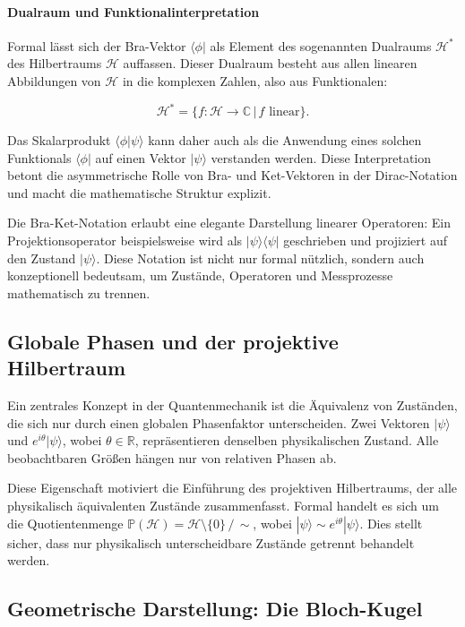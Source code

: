 \paragraph{Dualraum und Funktionalinterpretation}

Formal lässt sich der Bra-Vektor $\langle \phi|$ als Element des sogenannten Dualraums $\mathcal{H}^*$ des Hilbertraums $\mathcal{H}$ auffassen. Dieser Dualraum besteht aus allen linearen Abbildungen von $\mathcal{H}$ in die komplexen Zahlen, also aus Funktionalen:

\[
\mathcal{H}^* = \{ f : \mathcal{H} \to \mathbb{C} \,|\, f \text{ linear} \}.
\]

Das Skalarprodukt $\langle \phi | \psi \rangle$ kann daher auch als die Anwendung eines solchen Funktionals $\langle \phi|$ auf einen Vektor $|\psi\rangle$ verstanden werden. Diese Interpretation betont die asymmetrische Rolle von Bra- und Ket-Vektoren in der Dirac-Notation und macht die mathematische Struktur explizit.

Die Bra-Ket-Notation erlaubt eine elegante Darstellung linearer Operatoren: Ein Projektionsoperator beispielsweise wird als $|\psi\rangle\langle\psi|$ geschrieben und projiziert auf den Zustand $|\psi\rangle$. Diese Notation ist nicht nur formal nützlich, sondern auch konzeptionell bedeutsam, um Zustände, Operatoren und Messprozesse mathematisch zu trennen.

\subsection{Globale Phasen und der projektive Hilbertraum}

Ein zentrales Konzept in der Quantenmechanik ist die Äquivalenz von Zuständen, die sich nur durch einen globalen Phasenfaktor unterscheiden. Zwei Vektoren $|\psi\rangle$ und $e^{i\theta} |\psi\rangle$, wobei $\theta \in \mathbb{R}$, repräsentieren denselben physikalischen Zustand. Alle beobachtbaren Größen hängen nur von relativen Phasen ab.

Diese Eigenschaft motiviert die Einführung des projektiven Hilbertraums, der alle physikalisch äquivalenten Zustände zusammenfasst. Formal handelt es sich um die Quotientenmenge $\mathbb{P}(\mathcal{H}) = \mathcal{H} \setminus \{0\} \,/\, \sim$, wobei $|\psi\rangle \sim e^{i\theta}|\psi\rangle$. Dies stellt sicher, dass nur physikalisch unterscheidbare Zustände getrennt behandelt werden.

\subsection{Geometrische Darstellung: Die Bloch-Kugel}


